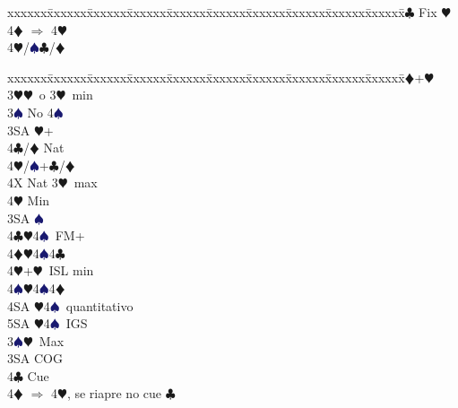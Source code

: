 \documentclass[a4paper,italian]{article}
\newcommand{\BC}{\textcolor{OliveGreen}{$\clubsuit$}}
\newcommand{\BD}{\textcolor{RedOrange}{$\vardiamondsuit$}}
\newcommand{\BH}{\textcolor{Red2}{$\varheartsuit${}}}
\newcommand{\BS}{\textcolor{MidnightBlue}{$\spadesuit${}}}
\newenvironment{bidtable}
{\begin{tabbing}

    xxxxxx\=xxxxxx\=xxxxxx\=xxxxxx\=xxxxxx\=xxxxxx\=xxxxxx\=xxxxxx\=xxxxxx\=xxxxxx\=\kill}
{\end{tabbing} }%
\begin{document}
\begin{multicols}{2}
\begin{bidtable}
                                            4\BC \> Fix \BH \\
                                            4\BD \> $\Rightarrow$ 4\BH \\
                                            4\BH/\BS {}\BC /\BD \-\-\\
                                        \end{bidtable}
                                        \columnbreak
                                        \begin{bidtable}
                                            3\BD {}+\BH \+\\
                                            3\BH {}\BH\ o 3\BH\ min\+\\
                                            3\BS \> No 4\BS \+\\
                                            3SA \BH +\+\\
                                            4\BC/\BD \> Nat\\
                                            4\BH/\BS {}+\BC /\BD \-\\
                                            4X \> Nat 3\BH\ max\\
                                            4\BH \> Min\-\\
                                            3SA \BS \\
                                            4\BC {}\BH 4\BS\ FM+\\
                                            4\BD {}\BH 4\BS 4\BC \\
                                            4\BH {}+\BH\ ISL min\\
                                            4\BS {}\BH 4\BS 4\BD \\
                                            4SA \BH 4\BS\ quantitativo\\
                                            5SA \BH 4\BS\ IGS\-\\
                                            3\BS {}\BH\ Max\+\\
                                            3SA\> COG\\
                                            4\BC\> Cue\\
                                            4\BD\> $\Rightarrow$ 4\BH, se riapre no cue \BC\\

\end{bidtable}
\end{multicols}
\end{document}
